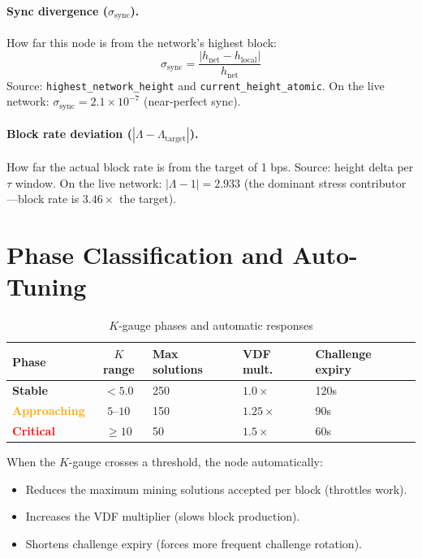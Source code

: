 \documentclass[11pt,a4paper]{article}
\begin{document}
\paragraph{Sync divergence ($\sigma_{\text{sync}}$).} How far this node is from the network's highest block:
\[
\sigma_{\text{sync}} = \frac{|h_{\text{net}} - h_{\text{local}}|}{h_{\text{net}}}
\]
Source: \texttt{highest\_network\_height} and \texttt{current\_height\_atomic}. On the live network: $\sigma_{\text{sync}} = 2.1 \times 10^{-7}$ (near-perfect sync).

\paragraph{Block rate deviation ($|\Lambda - \Lambda_{\text{target}}|$).} How far the actual block rate is from the target of 1 bps. Source: height delta per $\tau$ window. On the live network: $|\Lambda - 1| = 2.933$ (the dominant stress contributor---block rate is $3.46\times$ the target).

\section{Phase Classification and Auto-Tuning}

\begin{table}[H]
\centering
\caption{$K$-gauge phases and automatic responses}
\label{tab:kphase}
\begin{tabular}{@{}lclll@{}}
\toprule
\textbf{Phase} & \textbf{$K$ range} & \textbf{Max solutions} & \textbf{VDF mult.} & \textbf{Challenge expiry} \\
\midrule
\textcolor{green!60!black}{\textbf{Stable}}      & $< 5.0$ & 250 & $1.0\times$ & 120s \\
\textcolor{orange}{\textbf{Approaching}} & $5$--$10$ & 150 & $1.25\times$ & 90s \\
\textcolor{red}{\textbf{Critical}}    & $\geq 10$ & 50 & $1.5\times$ & 60s \\
\bottomrule
\end{tabular}
\end{table}

When the $K$-gauge crosses a threshold, the node automatically:
\begin{itemize}[nosep]
    \item Reduces the maximum mining solutions accepted per block (throttles work).
    \item Increases the VDF multiplier (slows block production).
    \item Shortens challenge expiry (forces more frequent challenge rotation).
\end{itemize}
\end{document}
